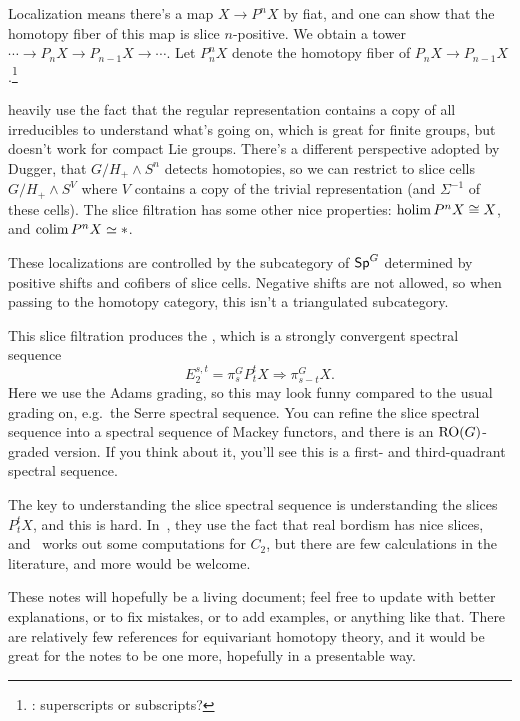 Localization means there's a map $X\to P^nX$ by fiat, and one can show that the homotopy fiber of this map is slice
$n$-positive. We obtain a tower $\dotsb\to P_nX\to P_{n-1}X\to \dotsb$. Let $P_n^nX$ denote the homotopy fiber of
$P_nX\to P_{n-1}X$.\footnote{\TODO: superscripts or subscripts?}

\cite{HHR} heavily use the fact that the regular
representation contains a copy of all irreducibles to understand what's going on, which is great for finite groups,
but doesn't work for compact Lie groups. There's a different perspective adopted by Dugger, that $G/H_+\wedge S^n$
detects homotopies, so we can restrict to slice cells $G/H_+\wedge S^V$ where $V$ contains a copy of the trivial
representation (and $\Sigma^{-1}$ of these cells). The slice filtration has some other nice properties: $\operatorname*{holim}
P^nX\cong X$, and $\operatorname*{colim} P^nX\simeq *$.

These localizations are controlled by the subcategory of $\mathsf{Sp}^G$ determined by positive shifts and cofibers of
slice cells. Negative shifts are not allowed, so when passing to the homotopy category, this isn't a triangulated
subcategory.

This slice filtration produces the , which is a strongly convergent spectral sequence
\begin{equation}
\label{SlSS}
E_2^{s,t} = \pi_s^G P_t^tX\Longrightarrow \pi_{s-t}^G X.
\end{equation}
Here we use the Adams grading, so this may look funny compared to the usual grading on, e.g.\ the Serre spectral
sequence. You can refine the slice spectral sequence into a spectral sequence of Mackey functors, and there is an
$\mathrm{RO}(G)$-graded version. If you think about it, you'll see this is a first- and third-quadrant spectral
sequence.

The key to understanding the slice spectral sequence is understanding the slices $P_t^tX$, and this is hard.
In~\cite{HHR}, they use the fact that real bordism has nice slices, and~ works out some computations
for $C_2$, but there are few calculations in the literature, and more would be welcome.
%

These notes will hopefully be a living document; feel free to update with better explanations, or to fix mistakes,
or to add examples, or anything like that. There are relatively few references for equivariant homotopy theory, and
it would be great for the notes to be one more, hopefully in a presentable way.
